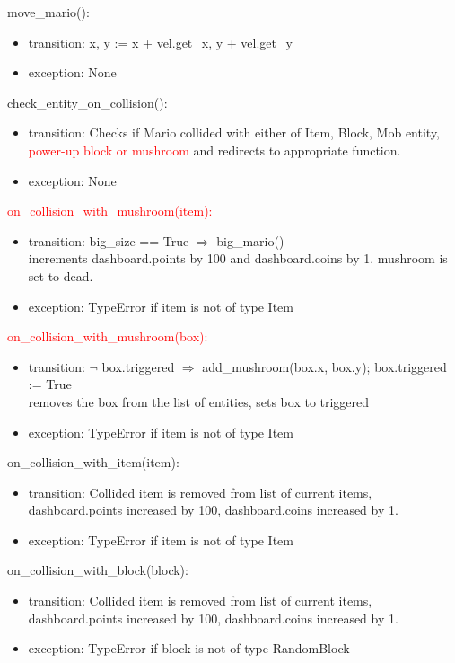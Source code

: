 \documentclass[12pt]{article}
\begin{document}
move\_mario():
\begin{itemize}
    \item transition: x, y := x + vel.get\_x, y + vel.get\_y
    \item exception: None
\end{itemize}

check\_entity\_on\_collision():
\begin{itemize}
    \item transition: Checks if Mario collided with either of Item, Block, Mob entity, \textcolor{red}{power-up block or mushroom} and redirects to appropriate function.
    \item exception: None
\end{itemize}

\textcolor{red}{on\_collision\_with\_mushroom(item):}
\begin{itemize}
    \item transition: big\_size == True $\Rightarrow$ big\_mario()\\
    increments dashboard.points by 100 and dashboard.coins by 1. mushroom is set to dead.
    \item exception: TypeError if item is not of type Item
\end{itemize}

\textcolor{red}{on\_collision\_with\_mushroom(box):}
\begin{itemize}
    \item transition: $\lnot$ box.triggered $\Rightarrow$ add\_mushroom(box.x, box.y); box.triggered := True\\
    removes the box from the list of entities, sets box to triggered
    \item exception: TypeError if item is not of type Item
\end{itemize}

on\_collision\_with\_item(item):
\begin{itemize}
    \item transition: Collided item is removed from list of current items, dashboard.points increased by 100, dashboard.coins increased by 1.
    \item exception: TypeError if item is not of type Item
\end{itemize}

on\_collision\_with\_block(block):
\begin{itemize}
    \item transition: Collided item is removed from list of current items, dashboard.points increased by 100, dashboard.coins increased by 1.
    \item exception: TypeError if block is not of type RandomBlock
\end{itemize}
\end{document}
